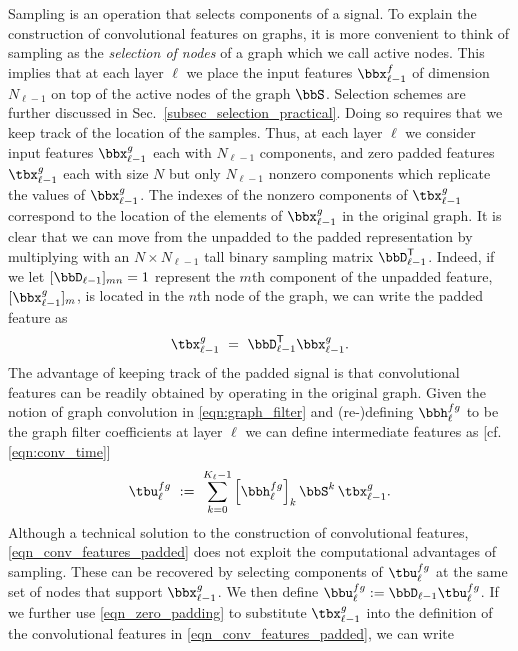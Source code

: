 Sampling is an operation that selects components of a signal. To explain the construction of convolutional features on graphs, it is more convenient to think of sampling as the \textit{selection of nodes} of a graph which we call active nodes. This implies that at each layer $\ell$ we place the input features $\bbx^f_{\ell-1}$ of dimension $N_{\ell-1}$ on top of the active nodes of the graph $\bbS$. Selection schemes are further discussed in Sec.~\ref{subsec_selection_practical}. Doing so requires that we keep track of the location of the samples. Thus, at each layer $\ell$ we consider input features $\bbx_{\ell-1}^{g}$ each with $N_{\ell-1}$ components, and zero padded features $\tbx_{\ell-1}^{g}$ each with size $N$ but only $N_{\ell-1}$ nonzero components which replicate the values of $\bbx_{\ell-1}^{g}$. The indexes of the nonzero components of $\tbx_{\ell-1}^{g}$ correspond to the location of the elements of $\bbx_{\ell-1}^{g}$ in the original graph. It is clear that we can move from the unpadded to the padded representation by multiplying with an $N \times N_{\ell-1}$ tall binary sampling matrix $\bbD_{\ell-1}^{\Tr}$. Indeed, if we let $[\bbD_{\ell-1}]_{mn}=1$ represent the $m$th component of the unpadded feature, $[\bbx_{\ell-1}^{g}]_m$, is located in the $n$th node of the graph, we can write the padded feature as
%
\begin{equation} \label{eqn_zero_padding}
   \tbx_{\ell-1}^{g} \ =\ \bbD_{\ell-1}^{\Tr} \bbx_{\ell-1}^{g} .
\end{equation}
%
The advantage of keeping track of the padded signal is that convolutional features can be readily obtained by operating in the original graph. Given the notion of graph convolution in \eqref{eqn:graph_filter} and (re-)defining $\bbh_{\ell}^{fg}$ to be the graph filter coefficients at layer $\ell$ we can define intermediate features as [cf. \eqref{eqn:conv_time}]
% 
\begin{equation} \label{eqn_conv_features_padded}
   \tbu_{\ell}^{fg} 
	\ :=  \ \sum_{k=0}^{K_{\ell}-1} 
	             \Big[ \bbh_{\ell}^{fg} \Big]_{k} \,
	             \bbS^{k} \,
	             \tbx_{\ell-1}^{g} .
\end{equation}
%
Although a technical solution to the construction of convolutional features, \eqref{eqn_conv_features_padded} does not exploit the computational advantages of sampling. These can be recovered by selecting components of $\tbu_{\ell}^{fg}$ at the same set of nodes that support $\bbx_{\ell-1}^{g}$. We then define $\bbu_{\ell}^{fg} := \bbD_{\ell-1} \tbu_{\ell}^{fg}$. If we further use \eqref{eqn_zero_padding} to substitute $\tbx_{\ell-1}^{g}$ into the definition of the convolutional features in \eqref{eqn_conv_features_padded}, we can write
